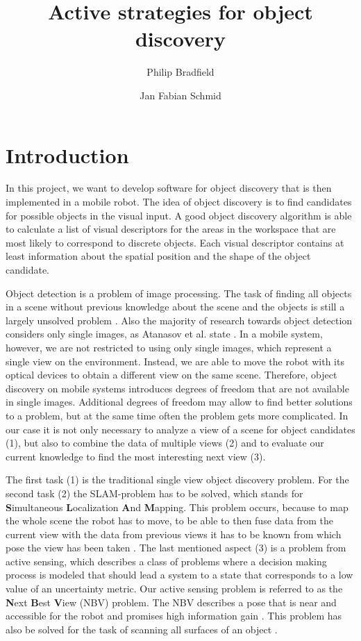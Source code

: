 \documentclass[a4paper,11pt,english]{article}
\begin{document}
\title{Active strategies for object discovery}
\author{Philip Bradfield \and Jan Fabian Schmid}
	
\maketitle 

\section{Introduction}
In this project, we want to develop software for object discovery that is then implemented in a mobile robot.
The idea of object discovery is to find candidates for possible objects in the visual input. A good object discovery algorithm is able to calculate a list of visual descriptors for the areas in the workspace that are most likely to correspond to discrete objects.
Each visual descriptor contains at least information about the spatial position and the shape of the object candidate.

Object detection is a problem of image processing. The task of finding all objects in a scene without previous knowledge about the scene and the objects is still a largely unsolved problem \cite{garcia2013computational}.
Also the majority of research towards object detection considers only single images, as Atanasov et al. state \cite{atanasov2014nonmyopic}.
In a mobile system, however, we are not restricted to using only single images, which represent a single view on the environment. Instead, we are able to move the robot with its optical devices to obtain a different view on the same scene.
Therefore, object discovery on mobile systems introduces degrees of freedom that are not available in single images.
Additional degrees of freedom may allow to find better solutions to a problem, but at the same time often the problem gets more complicated.
In our case it is not only necessary to analyze a view of a scene for object candidates (1), but also to combine the data of multiple views (2) and to evaluate our current knowledge to find the most interesting next view (3).

The first task (1) is the traditional single view object discovery problem. For the second task (2) the SLAM-problem has to be solved, which stands for \textbf{S}imultaneous \textbf{L}ocalization \textbf{A}nd \textbf{M}apping. This problem occurs, because to map the whole scene the robot has to move, to be able to then fuse data from the current view with the data from previous views it has to be known from which pose the view has been taken \cite{surmann2003autonomous}. 
The last mentioned aspect (3) is a problem from active sensing, which describes a class of problems where a decision making process is modeled that should lead a system to a state that corresponds to a low value of an uncertainty metric.
Our active sensing problem is referred to as the \textbf{N}ext \textbf{B}est \textbf{V}iew (NBV) problem.
The NBV describes a pose that is near and accessible for the robot and promises high information gain \cite{surmann2003autonomous}.
This problem has also be solved for the task of scanning all surfaces of an object \cite{pito1999solution}.
\end{document}
